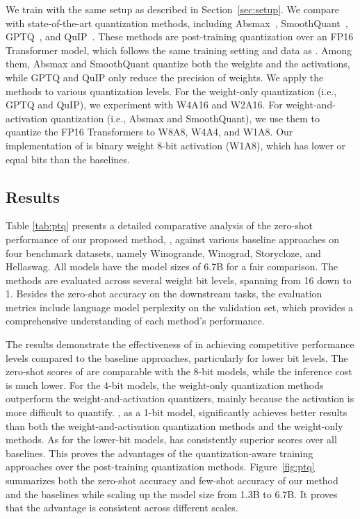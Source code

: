 We train \our{} with the same setup as described in Section~\ref{sec:setup}. We compare \our{} with state-of-the-art quantization methods, including Absmax~\cite{llmint8}, SmoothQuant~\cite{smoothquant}, GPTQ~\cite{gptq}, and QuIP~\cite{quip}. These methods are post-training quantization over an FP16 Transformer model, which follows the same training setting and data as \our{}. Among them, Absmax and SmoothQuant quantize both the weights and the activations, while GPTQ and QuIP only reduce the precision of weights. We apply the methods to various quantization levels. For the weight-only quantization (i.e., GPTQ and QuIP), we experiment with W4A16 and W2A16. For weight-and-activation quantization (i.e., Absmax and SmoothQuant), we use them to quantize the FP16 Transformers to W8A8, W4A4, and W1A8. Our implementation of \our{} is binary weight 8-bit activation (W1A8), which has lower or equal bits than the baselines.

\subsection{Results}

Table \ref{tab:ptq} presents a detailed comparative analysis of the zero-shot performance of our proposed method, \our{}, against various baseline approaches on four benchmark datasets, namely Winogrande, Winograd, Storycloze, and Hellaswag. All models have the model sizes of 6.7B for a fair comparison. The methods are evaluated across several weight bit levels, spanning from 16 down to 1. Besides the zero-shot accuracy on the downstream tasks, the evaluation metrics include language model perplexity on the validation set, which provides a comprehensive understanding of each method's performance.

The results demonstrate the effectiveness of \our{} in achieving competitive performance levels compared to the baseline approaches, particularly for lower bit levels. The zero-shot scores of \our{} are comparable with the 8-bit models, while the inference cost is much lower. For the 4-bit models, the weight-only quantization methods outperform the weight-and-activation quantizers, mainly because the activation is more difficult to quantify. \our{}, as a 1-bit model, significantly achieves better results than both the weight-and-activation quantization methods and the weight-only methods. As for the lower-bit models, \our{} has consistently superior scores over all baselines. This proves the advantages of the quantization-aware training approaches over the post-training quantization methods. Figure~\ref{fig:ptq} summarizes both the zero-shot accuracy and few-shot accuracy of our method and the baselines while scaling up the model size from 1.3B to 6.7B. It proves that the advantage is consistent across different scales.

